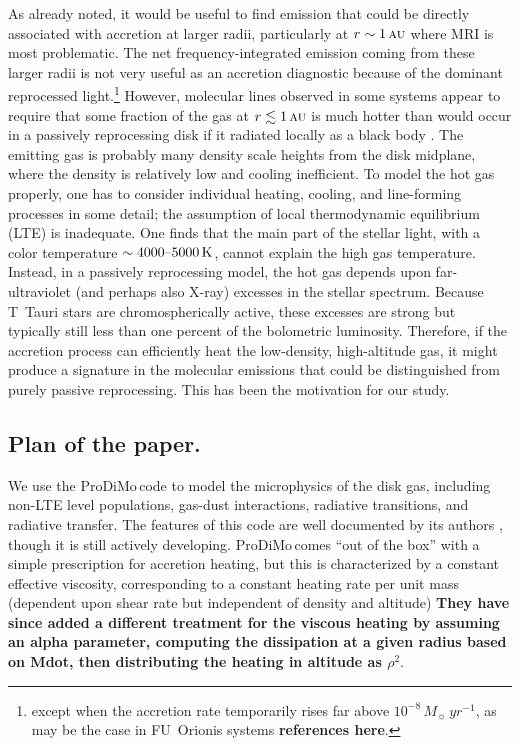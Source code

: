 \documentclass[12pt,preprint]{aastex}
\newcommand{\au}{\,\textsc{au}}
\newcommand{\prodimo}{{\sc ProDiMo}\,}
\newcommand{\remark}[1]{{\color{red}\bf#1}} %
\begin{document}
As already noted, it would be useful to find emission that could be directly associated
with accretion at larger radii, particularly at $r\sim 1\au$ where MRI is most
problematic.  The net frequency-integrated emission coming from these larger radii is not
very useful as an accretion diagnostic because of the dominant reprocessed
light.\footnote{except when the accretion rate temporarily rises far above
  $10^{-8}\,{M_\sun\,yr^{-1}}$, as may be the case in FU~Orionis systems
  \remark{references here}.}  However, molecular lines observed in some systems appear to
require that some fraction of the gas at $r\lesssim 1\au$ is much hotter than would occur
in a passively reprocessing disk if it radiated locally as a black body
\citep{Salyk_etal08,Carr_Najita08}.  The emitting gas is probably many density scale
heights from the disk midplane, where the density is relatively low and cooling
inefficient.  To model the hot gas properly, one has to consider individual heating,
cooling, and line-forming processes in some detail; the assumption of local thermodynamic
equilibrium (LTE) is inadequate.  One finds that the main part of the stellar light, with
a color temperature $\sim 4000\mbox{--}5000\,{\rm K}$, cannot explain the high gas
temperature.  Instead, in a passively reprocessing model, the hot gas depends upon
far-ultraviolet (and perhaps also X-ray) excesses in the stellar spectrum.  Because
T~Tauri stars are chromospherically active, these excesses are strong but typically still
less than one percent of the bolometric luminosity.  Therefore, if the accretion process
can efficiently heat the low-density, high-altitude gas, it might produce a signature in
the molecular emissions that could be distinguished from purely passive reprocessing.
This has been the motivation for our study.

\subsection{Plan of the paper.}

We use the \prodimo code to model the microphysics of the disk gas, including non-LTE
level populations, gas-dust interactions, radiative transitions, and radiative transfer.
The features of this code are well documented by its authors \citep{Woitke+etal2009,
Kamp+Tilling+Woitke+Thi2010,Woitke+Riaz+Duchene2011}, though it is still actively developing.
\prodimo comes ``out of the box'' with a simple prescription for accretion heating, but
this is characterized by a constant effective viscosity, corresponding to a constant
heating rate per unit mass (dependent upon shear rate but independent
of density and altitude) \remark{They have since added a different
  treatment for the viscous heating by assuming an alpha parameter,
  computing the dissipation at a given radius based on Mdot, then
  distributing the heating in altitude as $\rho^2$}.
\end{document}
